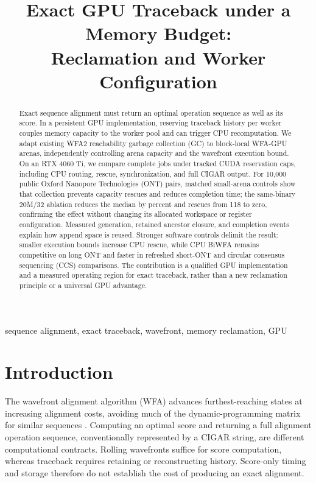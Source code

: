 \documentclass[conference,a4paper]{IEEEtran}
\begin{document}
\title{Exact GPU Traceback under a Memory Budget:\\Reclamation and Worker Configuration}
\author{}
\maketitle
\begin{abstract}
Exact sequence alignment must return an optimal operation sequence as well as its score. In a persistent GPU implementation, reserving traceback history per worker couples memory capacity to the worker pool and can trigger CPU recomputation. We adapt existing WFA2 reachability garbage collection (GC) to block-local WFA-GPU arenas, independently controlling arena capacity and the wavefront execution bound. On an RTX 4060 Ti, we compare complete jobs under tracked CUDA reservation caps, including CPU routing, rescue, synchronization, and full CIGAR output. For 10,000 public Oxford Nanopore Technologies (ONT) pairs, matched small-arena controls show that collection prevents capacity rescues and reduces completion time; the same-binary 20M/32 ablation reduces the median by \ModeReductionTwenty{} percent and rescues from 118 to zero, confirming the effect without changing its allocated workspace or register configuration. Measured generation, retained ancestor closure, and completion events explain how append space is reused. Stronger software controls delimit the result: smaller execution bounds increase CPU rescue, while CPU BiWFA remains competitive on long ONT and faster in refreshed short-ONT and circular consensus sequencing (CCS) comparisons. The contribution is a qualified GPU implementation and a measured operating region for exact traceback, rather than a new reclamation principle or a universal GPU advantage.
\end{abstract}
\begin{IEEEkeywords}sequence alignment, exact traceback, wavefront, memory reclamation, GPU\end{IEEEkeywords}

\section{Introduction}
The wavefront alignment algorithm (WFA) advances furthest-reaching states at increasing alignment costs, avoiding much of the dynamic-programming matrix for similar sequences \cite{wfa2021}. Computing an optimal score and returning a full alignment operation sequence, conventionally represented by a CIGAR string, are different computational contracts. Rolling wavefronts suffice for score computation, whereas traceback requires retaining or reconstructing history. Score-only timing and storage therefore do not establish the cost of producing an exact alignment.
\end{document}
